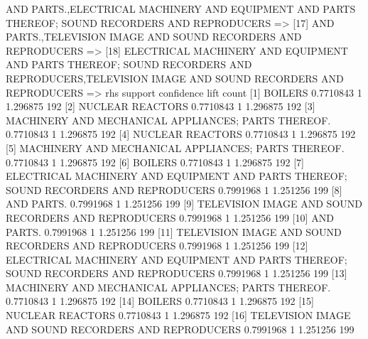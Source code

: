 \documentclass [a4paper] {article}
\begin{document}
{\begin{Schunk}
\begin{Soutput}
[16] {AND PARTS.,ELECTRICAL MACHINERY AND EQUIPMENT AND PARTS THEREOF; SOUND RECORDERS AND REPRODUCERS}                                           =>
[17] {AND PARTS.,TELEVISION IMAGE AND SOUND RECORDERS AND REPRODUCERS}                                                                            =>
[18] {ELECTRICAL MACHINERY AND EQUIPMENT AND PARTS THEREOF; SOUND RECORDERS AND REPRODUCERS,TELEVISION IMAGE AND SOUND RECORDERS AND REPRODUCERS} =>
     rhs                                                                                     support   confidence lift     count
[1]  {BOILERS}                                                                               0.7710843 1          1.296875 192  
[2]  {NUCLEAR REACTORS}                                                                      0.7710843 1          1.296875 192  
[3]  {MACHINERY AND MECHANICAL APPLIANCES; PARTS THEREOF.}                                   0.7710843 1          1.296875 192  
[4]  {NUCLEAR REACTORS}                                                                      0.7710843 1          1.296875 192  
[5]  {MACHINERY AND MECHANICAL APPLIANCES; PARTS THEREOF.}                                   0.7710843 1          1.296875 192  
[6]  {BOILERS}                                                                               0.7710843 1          1.296875 192  
[7]  {ELECTRICAL MACHINERY AND EQUIPMENT AND PARTS THEREOF; SOUND RECORDERS AND REPRODUCERS} 0.7991968 1          1.251256 199  
[8]  {AND PARTS.}                                                                            0.7991968 1          1.251256 199  
[9]  {TELEVISION IMAGE AND SOUND RECORDERS AND REPRODUCERS}                                  0.7991968 1          1.251256 199  
[10] {AND PARTS.}                                                                            0.7991968 1          1.251256 199  
[11] {TELEVISION IMAGE AND SOUND RECORDERS AND REPRODUCERS}                                  0.7991968 1          1.251256 199  
[12] {ELECTRICAL MACHINERY AND EQUIPMENT AND PARTS THEREOF; SOUND RECORDERS AND REPRODUCERS} 0.7991968 1          1.251256 199  
[13] {MACHINERY AND MECHANICAL APPLIANCES; PARTS THEREOF.}                                   0.7710843 1          1.296875 192  
[14] {BOILERS}                                                                               0.7710843 1          1.296875 192  
[15] {NUCLEAR REACTORS}                                                                      0.7710843 1          1.296875 192  
[16] {TELEVISION IMAGE AND SOUND RECORDERS AND REPRODUCERS}                                  0.7991968 1          1.251256 199  

\end{Soutput}
\end{Schunk}}
\end{document}
